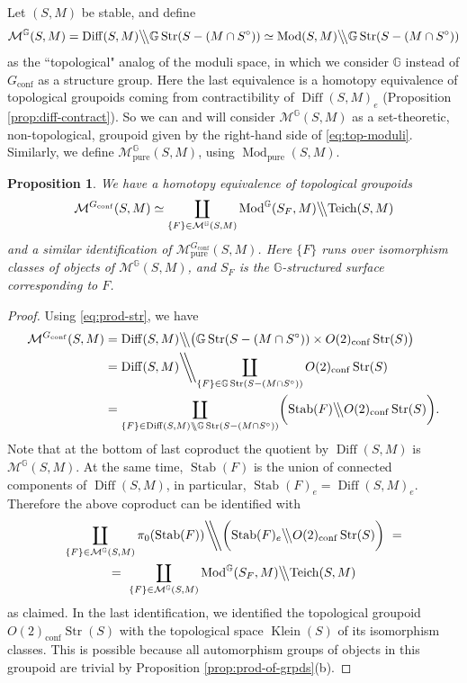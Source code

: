 \documentclass[english,11pt,leqno]{article}
\def\GG{\mathbb{G}}
\def\Mc{\mathcal{M}}
\def\conf{{\on{conf}}}
\def\Mod{\operatorname{Mod}}
\def\on{\operatorname}
\def\pure{{\on{pure}}}
\def\bbs{{\backslash\hskip -1mm \backslash}}
\def\Bbs {{\bigl\backslash \hskip -.1cm \bigl\backslash}}
\def\bbs{\backslash \hskip -.1cm \backslash}
\def\Bbs {\bigl\backslash \hskip -.1cm \bigl\backslash}
\def\Gstr{\GG\on{Str}}
\def\Klein{\on{Klein}}
\def\Teich{\on{Teich}}
\def\Diff{\on{Diff}}
\newtheorem{prop}[thm]{Proposition}
\theoremstyle{definition}
\theoremstyle{remark}
\numberwithin{equation}{section}
\begin{document}
Let $(S,M)$ be stable, and define
\begin{equation}
	\label{eq:top-moduli}
	\Mc^\GG(S,M) = \Diff(S,M)\Bbs \Gstr(S-(M\cap S^\circ)) \simeq
	\Mod(S,M) \Bbs \Gstr(S-(M\cap S^\circ)) 
\end{equation}
as the ``topological" analog of the moduli space, in which we consider $\GG$ instead of $G_\conf$ as
a structure group. Here the last equivalence is a homotopy equivalence of topological
groupoids coming from contractibility of $\Diff(S,M)_e$
(Proposition \ref {prop:diff-contract}). So we can and will consider $\Mc^\GG(S,M)$
as a set-theoretic, non-topological, groupoid given by the right-hand side of \eqref{eq:top-moduli}. 
Similarly, we define $\Mc^\GG_\pure(S,M)$, using $\Mod_\pure(S,M)$. 

\begin{prop}
We have a homotopy equivalence of topological groupoids
\[
\Mc^{G_\conf}(S,M) \simeq \coprod_{ \{F\} \in \Mc^\GG(S,M)} \Mod^\GG(S_F, M) \Bbs \Teich(S,M)
\]
and a similar identification of $\Mc^{G_\conf}_\pure(S,M)$. Here $\{ F\}$ runs over
isomorphism classes of objects of $\Mc^\GG(S,M)$, and $S_F$ is the $\GG$-structured
surface corresponding to $F$. 
\end{prop}

\begin{proof} Using  \eqref{eq:prod-str}, we have
\begin{align*}
\Mc^{G_\conf}(S,M) & = \Diff(S,M) \Bbs \bigl( \Gstr(S-(M\cap S^\circ)) \times O(2)_\conf\on{Str}(S)\bigr)\\
& = \Diff(S,M) \biggl\backslash \hskip -.25cm \biggl\backslash \coprod_{ \{F\}\in \Gstr(S-(M\cap S^\circ))} O(2)_\conf\on{Str}(S)\\
& = \coprod _{ \{F\}\in \Diff(S,M) \bbs \Gstr(S-(M\cap S^\circ))} \biggl( \on{Stab}(F) \Bbs O(2)_\conf\on{Str}(S)\biggr).
\end{align*}
Note that at the  bottom of last coproduct the quotient by $\Diff(S,M)$ is $\Mc^\GG(S,M)$. At the same time,
$\on{Stab}(F)$ is the union of connected components of $\Diff(S,M)$, in particular,
$\on{Stab}(F)_e = \Diff(S,M)_e$. 
Therefore the above coproduct can be identified with
\[
\begin{gathered}
\coprod_{ \{F\}\in\Mc^\GG(S,M)} \pi_0 (\on{Stab}(F)) 
\biggl\backslash \hskip -.25cm \biggl\backslash \biggl(  \on{Stab}(F)_e \Bbs O(2)_\conf\on{Str}(S)\biggr)\,\,=
\\ =\,\,
\coprod_{ \{F\} \in\Mc^\GG(S,M)} \Mod^\GG(S_F, M) \Bbs \Teich(S,M)
\end{gathered}
\]
as claimed. In the last identification, we identified the topological groupoid $O(2)_\conf\on{Str}(S)$
with the topological space $\Klein(S)$ of its isomorphism classes. This is possible because
all automorphism groups of objects in this groupoid are trivial by Proposition 
\ref{prop:prod-of-grpds}(b).\end{proof}
\end{document}
